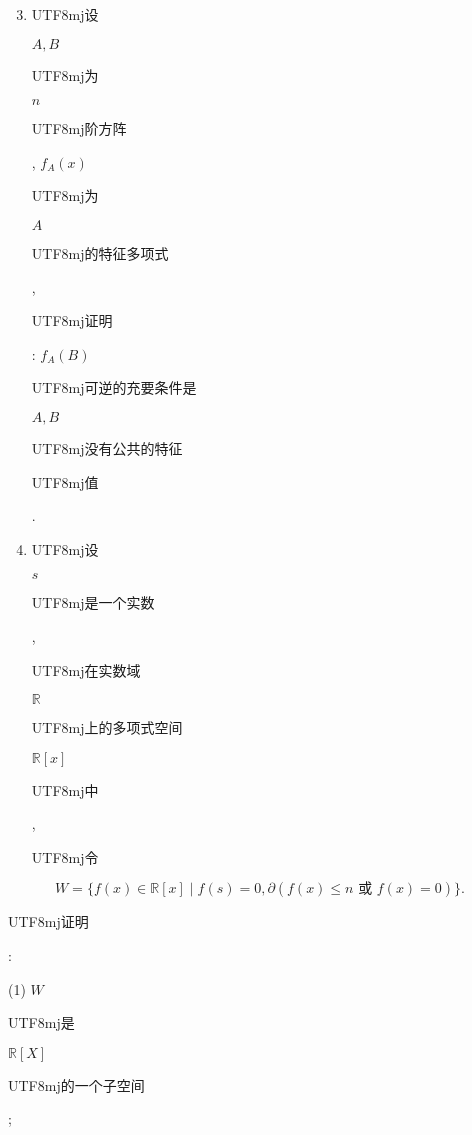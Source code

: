 \documentclass[10pt]{article}
\begin{document}
\begin{enumerate}
  \setcounter{enumi}{2}
  \item \begin{CJK}{UTF8}{mj}设\end{CJK} $A, B$ \begin{CJK}{UTF8}{mj}为\end{CJK} $n$ \begin{CJK}{UTF8}{mj}阶方阵\end{CJK}, $f_{A}(x)$ \begin{CJK}{UTF8}{mj}为\end{CJK} $A$ \begin{CJK}{UTF8}{mj}的特征多项式\end{CJK}, \begin{CJK}{UTF8}{mj}证明\end{CJK}: $f_{A}(B)$ \begin{CJK}{UTF8}{mj}可逆的充要条件是\end{CJK} $A, B$ \begin{CJK}{UTF8}{mj}没有公共的特征\end{CJK} \begin{CJK}{UTF8}{mj}值\end{CJK}.

  \item \begin{CJK}{UTF8}{mj}设\end{CJK} $s$ \begin{CJK}{UTF8}{mj}是一个实数\end{CJK}, \begin{CJK}{UTF8}{mj}在实数域\end{CJK} $\mathbb{R}$ \begin{CJK}{UTF8}{mj}上的多项式空间\end{CJK} $\mathbb{R}[x]$ \begin{CJK}{UTF8}{mj}中\end{CJK}, \begin{CJK}{UTF8}{mj}令\end{CJK}

\end{enumerate}
$$
W=\{f(x) \in \mathbb{R}[x] \mid f(s)=0, \partial(f(x) \leqslant n \text { 或 } f(x)=0)\} .
$$
\begin{CJK}{UTF8}{mj}证明\end{CJK}:

(1) $W$ \begin{CJK}{UTF8}{mj}是\end{CJK} $\mathbb{R}[X]$ \begin{CJK}{UTF8}{mj}的一个子空间\end{CJK};
\end{document}
